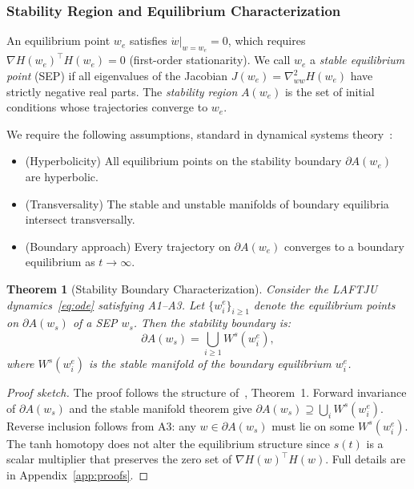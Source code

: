 \documentclass[10pt,twocolumn]{article}
\newtheorem{theorem}{Theorem}
\newcommand{\method}{LAFTJU}
\begin{document}
\subsubsection{Stability Region and Equilibrium Characterization}

An equilibrium point $w_e$ satisfies $\dot{w}|_{w=w_e} = 0$, which requires $\nabla H(w_e)^\top H(w_e) = 0$ (first-order stationarity). We call $w_e$ a \emph{stable equilibrium point} (SEP) if all eigenvalues of the Jacobian $J(w_e) = \nabla^2_{ww} H(w_e)$ have strictly negative real parts. The \emph{stability region} $A(w_e)$ is the set of initial conditions whose trajectories converge to $w_e$.

We require the following assumptions, standard in dynamical systems theory~\cite{htju}:
\begin{itemize}
\item[\textbf{A1}] (Hyperbolicity) All equilibrium points on the stability boundary $\partial A(w_e)$ are hyperbolic.
\item[\textbf{A2}] (Transversality) The stable and unstable manifolds of boundary equilibria intersect transversally.
\item[\textbf{A3}] (Boundary approach) Every trajectory on $\partial A(w_e)$ converges to a boundary equilibrium as $t \to \infty$.
\end{itemize}

\begin{theorem}[Stability Boundary Characterization]
\label{thm:boundary}
Consider the \method{} dynamics~\eqref{eq:ode} satisfying A1--A3. Let $\{w_i^e\}_{i \geq 1}$ denote the equilibrium points on $\partial A(w_s)$ of a SEP $w_s$. Then the stability boundary is:
\begin{equation}
\partial A(w_s) = \bigcup_{i \geq 1} W^s(w_i^e),
\end{equation}
where $W^s(w_i^e)$ is the stable manifold of the boundary equilibrium $w_i^e$.
\end{theorem}

\begin{proof}[Proof sketch]
The proof follows the structure of~\cite{htju}, Theorem~1. Forward invariance of $\partial A(w_s)$ and the stable manifold theorem give $\partial A(w_s) \supseteq \bigcup_i W^s(w_i^e)$. Reverse inclusion follows from A3: any $w \in \partial A(w_s)$ must lie on some $W^s(w_i^e)$. The tanh homotopy does not alter the equilibrium structure since $s(t)$ is a scalar multiplier that preserves the zero set of $\nabla H(w)^\top H(w)$. Full details are in Appendix~\ref{app:proofs}.
\end{proof}
\end{document}
